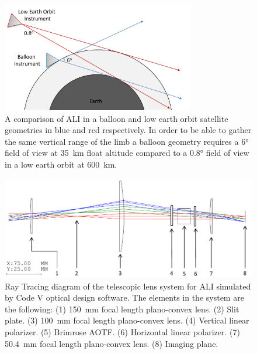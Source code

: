 \documentclass[12pt]{article}
\begin{document}
\clearpage

\begin{figure}
        \centering
        \includegraphics[width=0.75\textwidth]{./Images/5-4-BalloonGeometry.pdf}
        \caption{A comparison of ALI in a balloon and low earth orbit satellite geometries in blue and red respectively. In order to be able to gather the same vertical range of the limb a balloon geometry requires a 6\si{\degree} field of view at 35~km float altitude compared to a 0.8\si{\degree} field of view in a low earth orbit at 600~km.}
        \label{fig:5.4:balloonGeometry}
\end{figure}

\clearpage

\begin{figure}
    \includegraphics[width=1.0\textwidth]{./Images/3-2-TelescopicRayTracing.pdf}
    \caption{Ray Tracing diagram of the telescopic lens system for ALI simulated by Code V optical design software. The elements in the system are the following: (1) 150~mm focal length plano-convex lens. (2) Slit plate. (3) 100~mm focal length plano-convex lens. (4) Vertical linear polarizer. (5) Brimrose AOTF. (6) Horizontal linear polarizer. (7) 50.4~mm focal length plano-convex lens. (8) Imaging plane.}
    \label{fig:3.2:telescopicRayTracing}
\end{figure}

\clearpage
\end{document}
